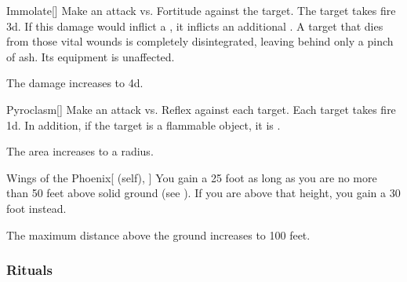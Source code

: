 \lowercase{\hypertarget{spell:Immolate}{}}\label{spell:Immolate}
\begin{freeability}[Rank 5]{\hypertarget{spell:Immolate}{Immolate}}[]
Make an attack vs. Fortitude against the target.
\hit The target takes fire  \plus3d.
If this damage would inflict a , it inflicts an additional .
A target that dies from those vital wounds is completely disintegrated, leaving behind only a pinch of ash.
Its equipment is unaffected.

\rankline
{} The damage increases to  \plus4d.
\end{freeability}
\vspace{0.25em}



\lowercase{\hypertarget{spell:Pyroclasm}{}}\label{spell:Pyroclasm}
\begin{freeability}[Rank 5]{\hypertarget{spell:Pyroclasm}{Pyroclasm}}[]
Make an attack vs. Reflex against each target.
\hit Each target takes fire  \minus1d.
In addition, if the target is a flammable object, it is .

\rankline
{} The area increases to a \arealarge radius.
\end{freeability}
\vspace{0.25em}



\lowercase{\hypertarget{spell:Wings of the Phoenix}{}}\label{spell:Wings of the Phoenix}
\begin{attuneability}[Rank 5]{\hypertarget{spell:Wings of the Phoenix}{Wings of the Phoenix}}[ (self), ]
You gain a 25 foot  as long as you are no more than 50 feet above solid ground (see ).
If you are above that height, you gain a 30 foot  instead.

\rankline
{} The maximum distance above the ground increases to 100 feet.
\end{attuneability}
\vspace{0.25em}



\subsubsection{Rituals}


